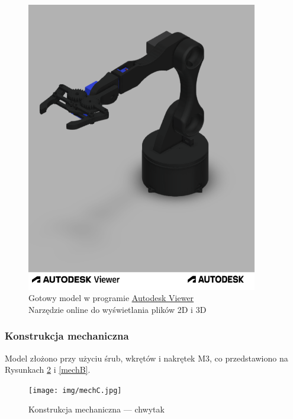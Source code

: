 \documentclass[11pt,titlepage]{article}
\begin{document}
\begin{figure}[p]
    \vspace{1cm}
    \begin{center}
        \includegraphics[width=0.9\textwidth]{img/Robak v25.f3d.png}
    \end{center}
    \caption[Gotowy model w programie
        \href{https://viewer.autodesk.com/}
        {\underline{Autodesk Viewer}}]
    {Gotowy model w programie
        \href{https://viewer.autodesk.com/}
        {\underline{Autodesk Viewer}} \\ Narzędzie online do wyświetlania plików 2D i 3D}
    \label{AutodeskViewer}
\end{figure}

\newpage

\subsubsection{Konstrukcja mechaniczna}

Model złożono przy użyciu śrub, wkrętów i nakrętek M3, co przedstawiono na Rysunkach \ref{mechC} i \ref{mechB}.

\begin{figure}[h!]
    \begin{center}
        \texttt{[image: img/mechC.jpg]}
    \end{center}
    \caption{Konstrukcja mechaniczna — chwytak}
    \label{mechC}
\end{figure}
\end{document}
